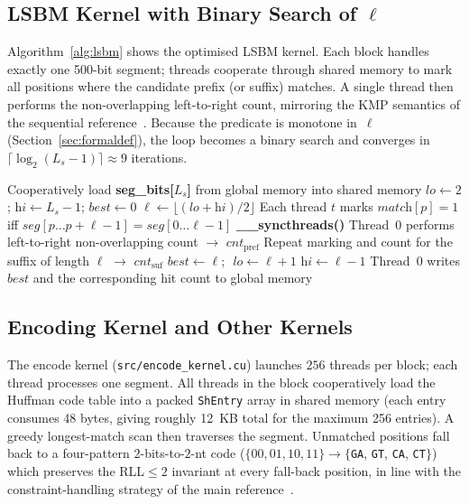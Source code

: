 \documentclass[runningheads]{llncs}
\begin{document}
\subsection{LSBM Kernel with Binary Search of $\ell$}
Algorithm~\ref{alg:lsbm} shows the optimised LSBM kernel.  Each block
handles exactly one 500-bit segment; threads cooperate through shared
memory to mark all positions where the candidate prefix (or suffix)
matches.  A single thread then performs the non-overlapping
left-to-right count, mirroring the KMP semantics of the sequential
reference~\cite{ref_kmp1977}.  Because the predicate is monotone in~$\ell$
(Section~\ref{sec:formaldef}), the loop becomes a binary search and
converges in
$\lceil \log_2 (L_s\!-\!1) \rceil \approx 9$ iterations.

\begin{algorithm}[t]
\caption{Binary-search LSBM kernel
(file \texttt{src/lsbm\_kernel.cu}).}
\label{alg:lsbm}
\begin{algorithmic}[1]
\State Cooperatively load \textbf{seg\_bits[$L_s$]} from global memory into shared memory
\State $\textit{lo}\gets 2$;
       $\textit{hi}\gets L_s-1$;
       $\textit{best}\gets 0$
    \State $\ell \gets \lfloor(\textit{lo}+\textit{hi})/2\rfloor$
    \State Each thread $t$ marks $\textit{match}[p]=1$
        iff $\textit{seg}[p\ldots p{+}\ell{-}1]=\textit{seg}[0\ldots\ell{-}1]$
    \State \textbf{\_\_syncthreads()}
    \State Thread~0 performs left-to-right non-overlapping count
        $\rightarrow$ $\textit{cnt}_{\text{pref}}$
    \State Repeat marking and count for the suffix of length $\ell$
        $\rightarrow$ $\textit{cnt}_{\text{suf}}$
        \State $\textit{best}\gets \ell$;
               \,\,$\textit{lo}\gets \ell+1$
    \Else
        \State $\textit{hi}\gets \ell-1$
    \EndIf
\EndWhile
\State Thread~0 writes $\textit{best}$ and the corresponding hit count to global memory
\end{algorithmic}
\end{algorithm}

\subsection{Encoding Kernel and Other Kernels}
The encode kernel (\texttt{src/encode\_kernel.cu}) launches
$256$ threads per block; each thread processes one segment.  All threads
in the block cooperatively load the Huffman code table into a packed
\texttt{ShEntry} array in shared memory (each entry consumes 48 bytes,
giving roughly 12~KB total for the maximum 256 entries).  A greedy
longest-match scan then traverses the segment.  Unmatched positions fall
back to a four-pattern $2$-bits-to-$2$-nt code
($\{00,01,10,11\}\rightarrow\{$\texttt{GA}, \texttt{GT}, \texttt{CA},
\texttt{CT}$\}$) which preserves the RLL$\leq 2$ invariant at every
fall-back position, in line with the constraint-handling strategy of the
main reference~\cite{ref_rste}.
\end{document}
